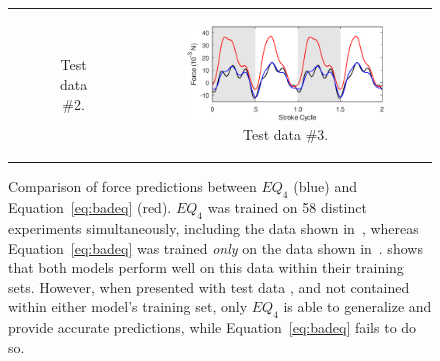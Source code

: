 \documentclass{article}
\begin{document}
\begin{figure}[ht]
\begin{tabular}{cc}
\begin{subfigure}{0.48\textwidth}
\caption{\label{fig:eq_goodbad_3} Test data \#2.}
\end{subfigure} &
\begin{subfigure}{0.48\textwidth}
\centering
\includegraphics[width=\textwidth]{figures/eq_goodbad_4}
\caption{\label{fig:eq_goodbad_4} Test data \#3.}
\end{subfigure}
\end{tabular}
\caption{Comparison of force predictions between $EQ_4$ (blue) and
Equation~\eqref{eq:badeq} (red). $EQ_4$ was trained on 58 distinct experiments
simultaneously, including the data shown in~, whereas
Equation~\eqref{eq:badeq} was trained \emph{only} on the data shown
in~.   shows that both models
perform well on this data within their training sets.  However, when presented
with test data ,  and
 not contained within either model's training set, only $EQ_4$ is able to
generalize and provide accurate predictions, while Equation~\eqref{eq:badeq}
fails to do so.}
\label{fig:eq_goodbad}
\end{figure}
\end{document}
